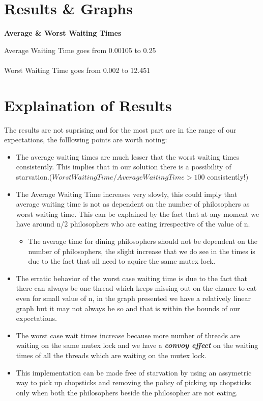 \documentclass[a4paper,12pt]{report}
\begin{document}
\newpage
\section{Results \& Graphs}
\begin{center}
\begin{large}
\textbf{Average \& Worst Waiting Times}\\
\end{large}
\begin{large}
Average Waiting Time goes from 0.00105 to 0.25\\~\\
Worst Waiting Time goes from 0.002 to 12.451\\
\end{large}
\newpage
\end{center}
\section{Explaination of Results}
The results are not suprising and for the most part are in the range of our expectations, the folllowing points are worth noting:
\begin{itemize}
\item The average waiting times are much lesser that the worst waiting times consistently. This implies that in our solution there is a possibility of starvation.($Worst Waiting Time/ Average Waiting Time > 100$ consistently!)
\item The Average Waiting Time increases very slowly, this could imply that average waiting time is not as dependent on the number of philosophers as worst waiting time. This can be explained by the fact that at any moment we have around n/2 philosophers who are eating irrespective of the value of n.
\begin{itemize}
\item The average time for dining philosophers should not be dependent on the number of philosophers, the slight increase that we do see in the times is due to the fact that all need to aquire the same mutex lock.
\end{itemize}
\item The erratic behavior of the worst case waiting time is due to the fact that there can always be one thread which keeps missing out on the chance to eat even for small value of n, in the graph presented we have a relatively linear graph but it may not always be so and that is within the bounds of our expectations.
\item The worst case wait times increase because more number of threads are waiting on the same mutex lock and we have a \textbf{\textit{convoy effect}} on the waiting times of all the threads which are waiting on the mutex lock.
\item This implementation can be made free of starvation by using an assymetric way to pick up chopsticks and removing the policy of picking up chopsticks only when both the philosophers beside the philosopher are not eating.
\end{itemize}
\end{document}
